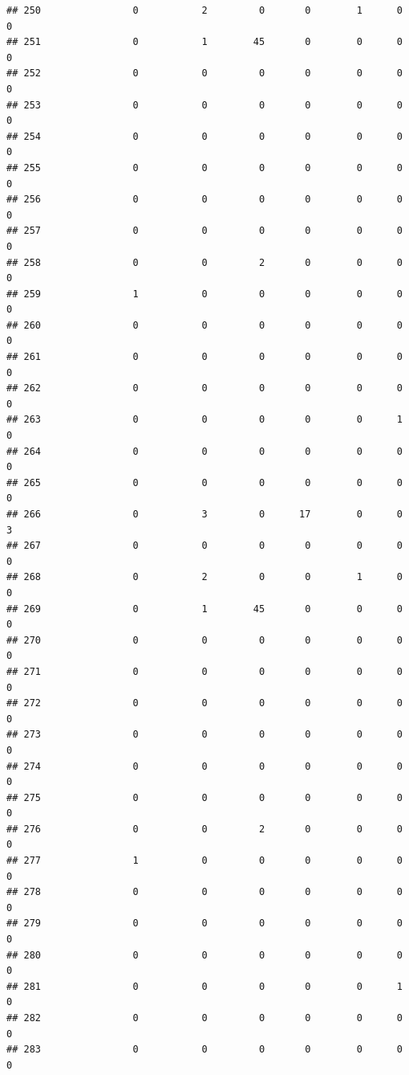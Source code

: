 \documentclass[
]{article}
\begin{document}
\begin{verbatim}
## 250                0           2         0       0        1      0      0
## 251                0           1        45       0        0      0      0
## 252                0           0         0       0        0      0      0
## 253                0           0         0       0        0      0      0
## 254                0           0         0       0        0      0      0
## 255                0           0         0       0        0      0      0
## 256                0           0         0       0        0      0      0
## 257                0           0         0       0        0      0      0
## 258                0           0         2       0        0      0      0
## 259                1           0         0       0        0      0      0
## 260                0           0         0       0        0      0      0
## 261                0           0         0       0        0      0      0
## 262                0           0         0       0        0      0      0
## 263                0           0         0       0        0      1      0
## 264                0           0         0       0        0      0      0
## 265                0           0         0       0        0      0      0
## 266                0           3         0      17        0      0      3
## 267                0           0         0       0        0      0      0
## 268                0           2         0       0        1      0      0
## 269                0           1        45       0        0      0      0
## 270                0           0         0       0        0      0      0
## 271                0           0         0       0        0      0      0
## 272                0           0         0       0        0      0      0
## 273                0           0         0       0        0      0      0
## 274                0           0         0       0        0      0      0
## 275                0           0         0       0        0      0      0
## 276                0           0         2       0        0      0      0
## 277                1           0         0       0        0      0      0
## 278                0           0         0       0        0      0      0
## 279                0           0         0       0        0      0      0
## 280                0           0         0       0        0      0      0
## 281                0           0         0       0        0      1      0
## 282                0           0         0       0        0      0      0
## 283                0           0         0       0        0      0      0

\end{verbatim}
\end{document}
